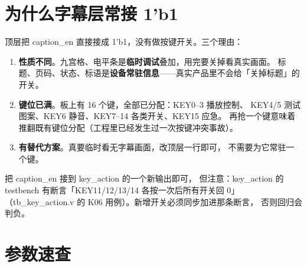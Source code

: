 \documentclass[10pt,a4paper]{article}
\newcommand{\sig}[1]{{\ttfamily\small #1}}
\newcommand{\code}[1]{{\ttfamily\small #1}}
\begin{document}
\section{为什么字幕层常接 \code{1'b1}}
\label{sec:always-on}

顶层把 \sig{caption\_en} 直接接成 \code{1'b1}，没有做按键开关。三个理由：

\begin{enumerate}
\item \textbf{性质不同}。九宫格、电平条是\textbf{临时调试}叠加，用完要关掉看真实画面。
      标题、页码、状态、标语是\textbf{设备常驻信息}——真实产品里不会给「关掉标题」的开关。
\item \textbf{键位已满}。板上有 16 个键，全部已分配：KEY0--3 播放控制、
      KEY4/5 测试图案、KEY6 静音、KEY7--14 各类开关、KEY15 应急。
      再抢一个键意味着推翻既有键位分配（工程里已经发生过一次按键冲突事故）。
\item \textbf{有替代方案}。真要临时看无字幕画面，改顶层一行即可，
      不需要为它常驻一个键。
\end{enumerate}

\begin{dsnote}[如果将来要加开关]
把 \sig{caption\_en} 接到 \sig{key\_action} 的一个新输出即可，
但注意：\sig{key\_action} 的 testbench 有断言「KEY11/12/13/14 各按一次后所有开关回 0」
（\code{tb\_key\_action.v} 的 K06 用例）。新增开关必须同步加进那条断言，
否则回归会判负。
\end{dsnote}

\section{参数速查}
\label{sec:params}
\end{document}
